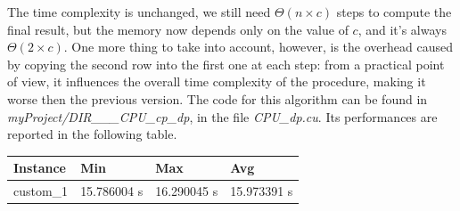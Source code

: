\documentclass[12pt]{extarticle}
\begin{document}
The time complexity is unchanged, we still need $\Theta(n \times c)$ steps to compute the final result, but the memory now depends only on the value of $c$, and it's always $\Theta(2 \times c)$. One more thing to take into account, however, is the overhead caused by copying the second row into the first one at each step: from a practical point of view, it influences the overall time complexity of the procedure, making it worse then the previous version.\newline
The code for this algorithm can be found in \emph{myProject/DIR\_\_\_CPU\_cp\_dp}, in the file \emph{CPU\_dp.cu}.\newline
Its performances are reported in the following table.
\begin{center}
\begin{tabular}{ | m{2.2cm} | m{2.2cm} | m{2.2cm} | m{2.2cm} |}
 \hline
 Instance & Min & Max & Avg\\
 \hline
 custom\_1 & 15.786004 s & 16.290045 s & 15.973391 s\\
 \hline
\end{tabular}
\end{center}
\end{document}
